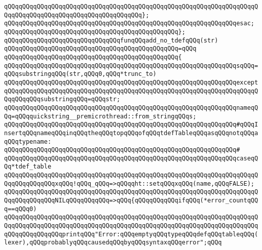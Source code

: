 \verb|qQQqqQQqqQQqqQQqqQQqqQQqqQQqqQQqqQQqqQQqqQQqqQQqqQQqqQQqqQQqqQQqqQQqqQQqqQQqqQQqqQQqqQQqqQQqqQQqqQQqqQQqqQQq};|\newline
\verb|qQQqqQQqqQQqqQQqqQQqqQQqqQQqqQQqqQQqqQQqqQQqqQQqqQQqqQQqqQQqqQQqesac;|\newline
\verb|qQQqqQQqqQQqqQQqqQQqqQQqqQQqqQQqqQQqqQQqqQQqqQQq};|\newline
\newline
\verb|qQQqqQQqqQQqqQQqqQQqqQQqqQQqqQQqfunqQQqadd_no_tdefqQQq(str)|\newline
\verb|qQQqqQQqqQQqqQQqqQQqqQQqqQQqqQQqqQQqqQQqqQQqqQQq=qQQq|\newline
\verb|qQQqqQQqqQQqqQQqqQQqqQQqqQQqqQQqqQQqqQQqqQQqqQQq{|\newline
\verb|qQQqqQQqqQQqqQQqqQQqqQQqqQQqqQQqqQQqqQQqqQQqqQQqqQQqqQQqqQQqqQQqsqQQq=qQQqsubstringqQQq(str,qQQq0,qQQq*trunc_to)|\newline
\verb|qQQqqQQqqQQqqQQqqQQqqQQqqQQqqQQqqQQqqQQqqQQqqQQqqQQqqQQqqQQqqQQqexcept|\newline
\verb|qQQqqQQqqQQqqQQqqQQqqQQqqQQqqQQqqQQqqQQqqQQqqQQqqQQqqQQqqQQqqQQqqQQqqQQqqQQqqQQqsubstringqQQq=qQQqstr;|\newline
\newline
\verb|qQQqqQQqqQQqqQQqqQQqqQQqqQQqqQQqqQQqqQQqqQQqqQQqqQQqqQQqqQQqqQQqnameqQQq=qQQqquickstring__premicrothread::from_stringqQQqs;|\newline
\newline
\verb|qQQqqQQqqQQqqQQqqQQqqQQqqQQqqQQqqQQqqQQqqQQqqQQqqQQqqQQqqQQqqQQq#qQQqInsertqQQqnameqQQqinqQQqtheqQQqtopqQQqofqQQqtdefTableqQQqasqQQqnotqQQqaqQQqtypename:|\newline
\verb|qQQqqQQqqQQqqQQqqQQqqQQqqQQqqQQqqQQqqQQqqQQqqQQqqQQqqQQqqQQqqQQq#|\newline
\verb|qQQqqQQqqQQqqQQqqQQqqQQqqQQqqQQqqQQqqQQqqQQqqQQqqQQqqQQqqQQqqQQqcaseqQQq*tdef_table|\newline
\newline
\verb|qQQqqQQqqQQqqQQqqQQqqQQqqQQqqQQqqQQqqQQqqQQqqQQqqQQqqQQqqQQqqQQqqQQqqQQqqQQqqQQqqQQqxqQQq!qQQq_qQQq=>qQQqqht::setqQQqxqQQq(name,qQQqFALSE);|\newline
\newline
\verb|qQQqqQQqqQQqqQQqqQQqqQQqqQQqqQQqqQQqqQQqqQQqqQQqqQQqqQQqqQQqqQQqqQQqqQQqqQQqqQQqqQQqNILqQQqqQQqqQQq=>qQQq{qQQqqQQqqQQqifqQQq(*error_countqQQq==qQQq0)|\newline
\newline
\verb|qQQqqQQqqQQqqQQqqQQqqQQqqQQqqQQqqQQqqQQqqQQqqQQqqQQqqQQqqQQqqQQqqQQqqQQqqQQqqQQqqQQqqQQqqQQqqQQqqQQqqQQqqQQqqQQqqQQqqQQqqQQqqQQqqQQqqQQqqQQqqQQqqQQqqQQqqQQqprintqQQq"Error:qQQqemptyqQQqtypeqQQqdefqQQqtableqQQq(lexer),qQQqprobablyqQQqcausedqQQqbyqQQqsyntaxqQQqerror";qQQq|\newline
